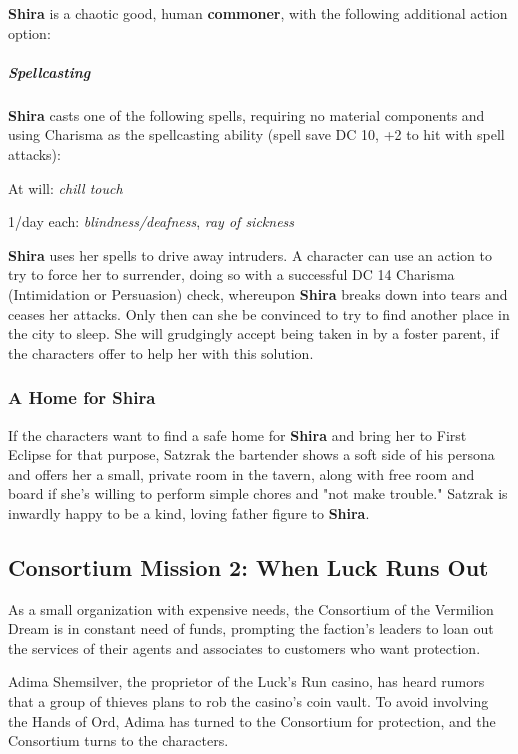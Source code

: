 \documentclass[10pt,a4paper,twoside,fancy,bg=print,twocolumn,openany,nodeprecatedcode]{dndbook}
\begin{document}
\textbf{Shira} is a chaotic good, human \textbf{commoner}, with the following additional action option:

\begin{DndSidebar}[float=!b]{}
\subparagraph{Spellcasting}
\textbf{Shira} casts one of the following spells, requiring no material components and using Charisma as the spellcasting ability (spell save DC 10, +2 to hit with spell attacks):

At will: \textit{chill touch}

1/day each: \textit{blindness/deafness}, \textit{ray of sickness}



\end{DndSidebar}

\textbf{Shira} uses her spells to drive away intruders. A character can use an action to try to force her to surrender, doing so with a successful DC 14 Charisma (Intimidation or Persuasion) check, whereupon \textbf{Shira} breaks down into tears and ceases her attacks. Only then can she be convinced to try to find another place in the city to sleep. She will grudgingly accept being taken in by a foster parent, if the characters offer to help her with this solution.

\subsubsection{A Home for Shira}
If the characters want to find a safe home for \textbf{Shira} and bring her to First Eclipse for that purpose, Satzrak the bartender shows a soft side of his persona and offers her a small, private room in the tavern, along with free room and board if she's willing to perform simple chores and "not make trouble." Satzrak is inwardly happy to be a kind, loving father figure to \textbf{Shira}.

\subsection{Consortium Mission 2: When Luck Runs Out}
As a small organization with expensive needs, the Consortium of the Vermilion Dream is in constant need of funds, prompting the faction's leaders to loan out the services of their agents and associates to customers who want protection.

Adima Shemsilver, the proprietor of the Luck's Run casino, has heard rumors that a group of thieves plans to rob the casino's coin vault. To avoid involving the Hands of Ord, Adima has turned to the Consortium for protection, and the Consortium turns to the characters.
\end{document}
